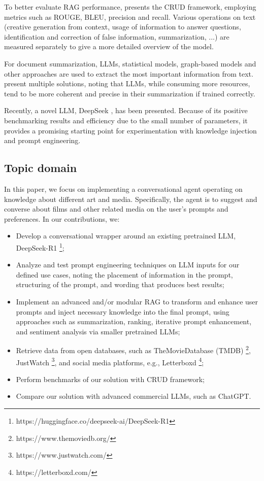 \documentclass[fleqn,moreauthors,10pt]{ds_report}
\begin{document}
To better evaluate RAG performance, \cite{benchmark} presents the CRUD framework, employing metrics such as ROUGE, BLEU, precision and recall. Various operations on text (creative generation from context, usage of information to answer questions, identification and correction of false information, summarization, ...) are measured separately to give a more detailed overview of the model. 

For document summarization, LLMs, statistical models, graph-based models and other approaches are used to extract the most important information from text. \cite{summarization} present multiple solutions, noting that LLMs, while consuming more resources, tend to be more coherent and precise in their summarization if trained correctly. 

Recently, a novel LLM, DeepSeek \cite{deepseek3}, has been presented. Because of its positive benchmarking results and efficiency due to the small number of parameters, it provides a promising starting point for experimentation with knowledge injection and prompt engineering. 

\subsection*{Topic domain}
In this paper, we focus on implementing a conversational agent operating on knowledge about different art and media. Specifically, the agent is to suggest and converse about films and other related media on the user’s prompts and preferences. In our contributions, we: 
\begin{itemize}
\item Develop a conversational wrapper around an existing pretrained LLM, DeepSeek-R1 \footnote{https://huggingface.co/deepseek-ai/DeepSeek-R1}; 
\item Analyze and test prompt engineering techniques on LLM inputs for our defined use cases, noting the placement of information in the prompt, structuring of the prompt, and wording that produces best results; 
\item Implement an advanced and/or modular RAG to transform and enhance user prompts and inject necessary knowledge into the final prompt, using approaches such as summarization, ranking, iterative prompt enhancement, and sentiment analysis via smaller pretrained LLMs; 
\item Retrieve data from open databases, such as The\-Movie\-Database (TMDB) \footnote{https://www.themoviedb.org/}, JustWatch \footnote{https://www.justwatch.com/}, and social media platforms, e.g., Letterboxd \footnote{https://letterboxd.com/}; 
\item Perform benchmarks of our solution with CRUD framework; 
\item Compare our solution with advanced commercial LLMs, such as ChatGPT. 
\end{itemize}
\end{document}
